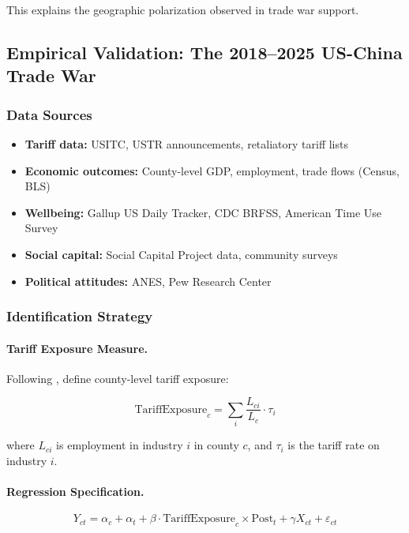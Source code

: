 This explains the geographic polarization observed in trade war support.

\subsection{Empirical Validation: The 2018--2025 US-China Trade War}

\subsubsection{Data Sources}

\begin{itemize}
    \item \textbf{Tariff data:} USITC, USTR announcements, retaliatory tariff lists
    \item \textbf{Economic outcomes:} County-level GDP, employment, trade flows (Census, BLS)
    \item \textbf{Wellbeing:} Gallup US Daily Tracker, CDC BRFSS, American Time Use Survey
    \item \textbf{Social capital:} Social Capital Project data, community surveys
    \item \textbf{Political attitudes:} ANES, Pew Research Center
\end{itemize}

\subsubsection{Identification Strategy}

\paragraph{Tariff Exposure Measure.}
Following \citet{autor2013china}, define county-level tariff exposure:

\begin{equation}
\text{TariffExposure}_c = \sum_i \frac{L_{ci}}{L_c} \cdot \tau_i
\end{equation}

where $L_{ci}$ is employment in industry $i$ in county $c$, and $\tau_i$ is 
the tariff rate on industry $i$.

\paragraph{Regression Specification.}
\begin{equation}
Y_{ct} = \alpha_c + \alpha_t + \beta \cdot \text{TariffExposure}_c \times \text{Post}_t + \gamma X_{ct} + \varepsilon_{ct}
\label{eq:did-regression}
\end{equation}

